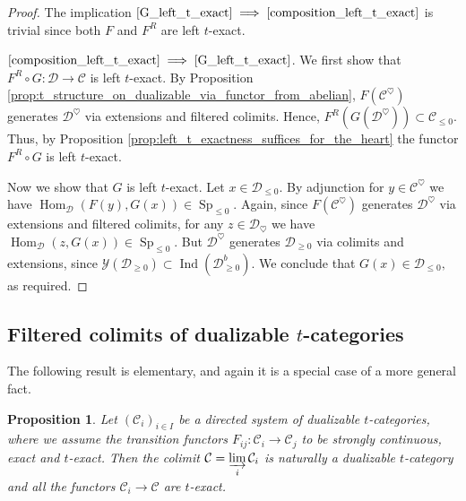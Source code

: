 \documentclass[11pt,leqno]{amsart}
\newcommand{\Implies}[2]{$\text{\ref{#1}}\implies\text{\ref{#2}}$}
\newtheorem{prop}[theo]{Proposition}
\numberwithin{equation}{section}
\def\Hom{\operatorname{Hom}}
\newcommand{\indlim}[1][]{\mathop{\varinjlim}\limits_{#1}}
\newcommand{\cD}{{\mathcal D}}
\newcommand{\cC}{{\mathcal C}}
\newcommand{\cY}{{\mathcal Y}}
\newcommand{\Sp}{\operatorname{Sp}}
\newcommand{\Ind}{\operatorname{Ind}}
\begin{document}
\begin{proof}
The implication \Implies{G_left_t_exact}{composition_left_t_exact} is trivial since both $F$ and $F^R$ are left $t$-exact.

\Implies{composition_left_t_exact}{G_left_t_exact}. We first show that $F^R\circ G:\cD\to\cC$ is left $t$-exact. By Proposition \ref{prop:t_structure_on_dualizable_via_functor_from_abelian}, $F(\cC^{\heartsuit})$ generates $\cD^{\heartsuit}$ via extensions and filtered colimits. Hence, $F^R(G(\cD^{\heartsuit}))\subset\cC_{\leq 0}.$ Thus, by Proposition \ref{prop:left_t_exactness_suffices_for_the_heart} the functor $F^R\circ G$ is left $t$-exact.

Now we show that $G$ is left $t$-exact. Let $x\in\cD_{\leq 0}.$ By adjunction for $y\in\cC^{\heartsuit}$ we have $\Hom_{\cD}(F(y),G(x))\in\Sp_{\leq 0}.$ Again, since $F(\cC^{\heartsuit})$ generates $\cD^{\heartsuit}$ via extensions and filtered colimits, for any $z\in\cD_{\heartsuit}$ we have $\Hom_{\cD}(z,G(x))\in\Sp_{\leq 0}.$ But $\cD^{\heartsuit}$ generates $\cD_{\geq 0}$ via colimits and extensions, since $\hat{\cY}(\cD_{\geq 0})\subset\Ind(\cD^b_{\geq 0}).$ We conclude that $G(x)\in \cD_{\leq 0},$ as required.
\end{proof}

\subsection{Filtered colimits of dualizable $t$-categories}

The following result is elementary, and again it is a special case of a more general fact.

\begin{prop}\label{prop:filtered_colimit_of_dualizable_t_categories}
Let $(\cC_i)_{i\in I}$ be a directed system of dualizable $t$-categories, where we assume the transition functors $F_{ij}:\cC_i\to\cC_j$ to be strongly continuous, exact and $t$-exact. Then the colimit $\cC=\indlim[i]\cC_i$ is naturally a dualizable $t$-category and all the functors $\cC_i\to\cC$ are $t$-exact.
\end{prop}
\end{document}
